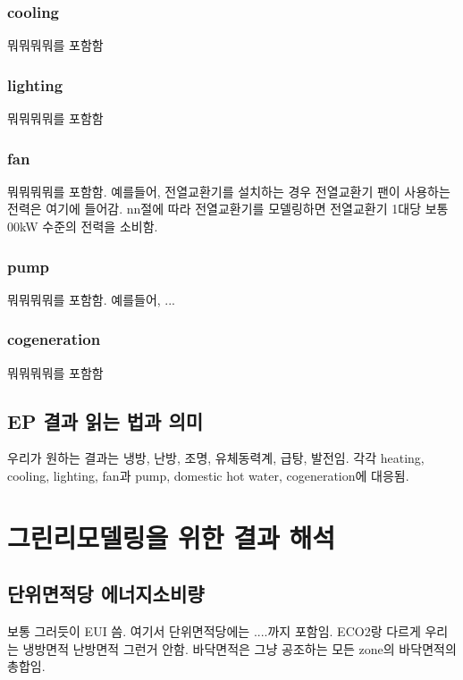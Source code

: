 \subsubsection{cooling}
뭐뭐뭐뭐를 포함함

\subsubsection{lighting}
뭐뭐뭐뭐를 포함함

\subsubsection{fan}
뭐뭐뭐뭐를 포함함.
예를들어, 전열교환기를 설치하는 경우 전열교환기 팬이 사용하는 전력은 여기에 들어감.
nn절에 따라 전열교환기를 모델링하면 전열교환기 1대당 보통 00kW 수준의 전력을 소비함.

\subsubsection{pump}
뭐뭐뭐뭐를 포함함. 예를들어, ...

\subsubsection{cogeneration}
뭐뭐뭐뭐를 포함함

\subsection{EP 결과 읽는 법과 의미}
우리가 원하는 결과는 냉방, 난방, 조명, 유체동력계, 급탕, 발전임.
각각 heating, cooling, lighting, fan과 pump, domestic hot water, cogeneration에 대응됨.


\section{그린리모델링을 위한 결과 해석}

\subsection{단위면적당 에너지소비량}
보통 그러듯이 EUI 씀. 여기서 단위면적당에는 ....까지 포함임. ECO2랑 다르게 우리는 냉방면적 난방면적 그런거 안함.
바닥면적은 그냥 공조하는 모든 zone의 바닥면적의 총합임.

